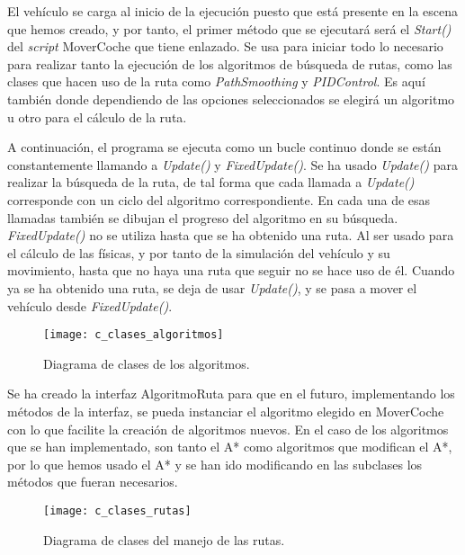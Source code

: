 El vehículo se carga al inicio de la ejecución puesto que está presente en la escena que hemos creado, y por tanto, el primer método que se ejecutará será el \textit{Start()} del \textit{script} MoverCoche que tiene enlazado. Se usa para iniciar todo lo necesario para realizar tanto la ejecución de los algoritmos de búsqueda de rutas, como las clases que hacen uso de la ruta como \textit{PathSmoothing} y \textit{PIDControl}. Es aquí también donde dependiendo de las opciones seleccionados se elegirá un algoritmo u otro para el cálculo de la ruta.

A continuación, el programa se ejecuta como un bucle continuo donde se están constantemente llamando a \textit{Update()} y \textit{FixedUpdate()}. Se ha usado \textit{Update()} para realizar la búsqueda de la ruta, de tal forma que cada llamada a \textit{Update()} corresponde con un ciclo del algoritmo correspondiente. En cada una de esas llamadas también se dibujan el progreso del algoritmo en su búsqueda. \textit{FixedUpdate()} no se utiliza hasta que se ha obtenido una ruta. Al ser usado para el cálculo de las físicas, y por tanto de la simulación del vehículo y su movimiento, hasta que no haya una ruta que seguir no se hace uso de él. Cuando ya se ha obtenido una ruta, se deja de usar \textit{Update()}, y se pasa a mover el vehículo desde \textit{FixedUpdate()}.

\begin{figure}[htpb]
    \centering
    \texttt{[image: c\_clases\_algoritmos]}
    \caption[Diagrama de clases de los algoritmos]{Diagrama de clases de los algoritmos.}
    \label{fig:cclasesalgoritmos}
\end{figure}

Se ha creado la interfaz AlgoritmoRuta para que en el futuro, implementando los métodos de la interfaz, se pueda instanciar el algoritmo elegido en MoverCoche con lo que facilite la creación de algoritmos nuevos. En el caso de los algoritmos que se han implementado, son tanto el A* como algoritmos que modifican el A*, por lo que hemos usado el A* y se han ido modificando en las subclases los métodos que fueran necesarios.

\begin{figure}[htpb]
    \centering
    \texttt{[image: c\_clases\_rutas]}
    \caption[Diagrama de clases del manejo de las rutas]{Diagrama de clases del manejo de las rutas.}
    \label{fig:cclasesrutas}
\end{figure}

